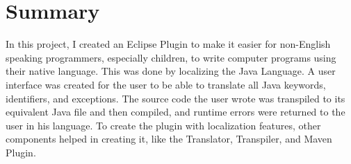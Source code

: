 \section{Summary}
In this project, I created an Eclipse Plugin to make it easier for non-English speaking programmers, especially children, to write computer programs using their native language. This was done by localizing the Java Language. A user interface was created for the user to be able to translate all Java keywords, identifiers, and exceptions. The source code the user wrote was transpiled to its equivalent Java file and then compiled, and runtime errors were returned to the user in his language. To create the plugin with localization features, other components helped in creating it, like the Translator, Transpiler, and Maven Plugin. 


